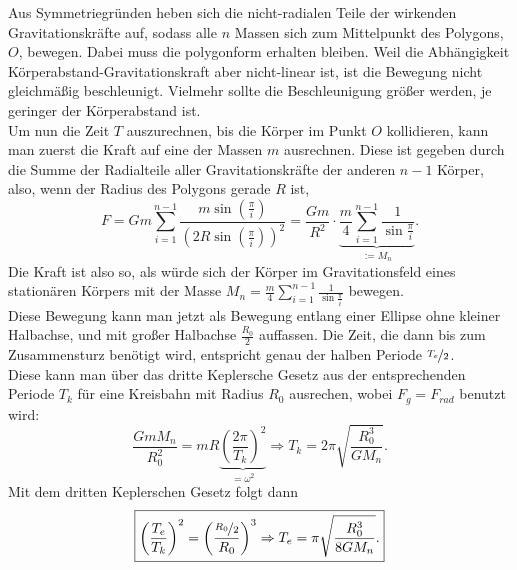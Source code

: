 \begin{Answer}[ref = polygrav]
	Aus Symmetriegründen heben sich die nicht-radialen Teile der wirkenden Gravitationskräfte auf, sodass alle $n$ Massen sich zum Mittelpunkt des Polygons, $O$, bewegen. Dabei muss die polygonform erhalten bleiben. Weil die Abhängigkeit Körperabstand-Gravitationskraft aber nicht-linear ist, ist die Bewegung nicht gleichmäßig beschleunigt. Vielmehr sollte die Beschleunigung größer werden, je geringer der Körperabstand ist.\\
	Um nun die Zeit $T$ auszurechnen, bis die Körper im Punkt $O$ kollidieren, kann man zuerst die Kraft auf eine der Massen $m$ ausrechnen. Diese ist gegeben durch die Summe der Radialteile aller  Gravitationskräfte der anderen $n-1$ Körper, also, wenn der Radius des Polygons gerade $R$ ist,
	\begin{equation}\label{polygrav:f}
		F = Gm \sum_{i= 1}^{n-1}\frac{m \sin\left(\frac{\pi}{i}\right)}{\left(2R  \sin\left(\frac{\pi}{i}\right)\right)^2} = \frac{Gm}{R^2}\cdot \underbrace{ \frac{m}{4}\sum_{i=1}^{n-1} \frac{1}{\sin \frac{\pi}{i}}}_{:= M_n}.
 	\end{equation}
 	Die Kraft ist also so, als würde sich der Körper im Gravitationsfeld eines stationären Körpers mit der Masse $M_n = \frac{m}{4}\sum_{i=1}^{n-1} \frac{1}{\sin \frac{\pi}{i}}$ bewegen.\\
 	Diese Bewegung kann man jetzt als Bewegung entlang einer Ellipse ohne kleiner Halbachse, und mit großer Halbachse $\frac{R_0}{2}$ auffassen. Die Zeit, die dann bis zum Zusammensturz benötigt wird, entspricht genau der halben Periode $\nicefrac{T_e}{2}$. \\
 	Diese kann man über das dritte Keplersche Gesetz aus der entsprechenden Periode $T_k$ für eine Kreisbahn mit Radius $R_0$ ausrechen, wobei $F_g = F_{rad}$ benutzt wird:
 	\begin{equation}\label{polygrav:tc}
 		\frac{GmM_n}{R_0^2}  = m R\underbrace{\left(\frac{2\pi}{T_k}\right)^2}_{=\omega ^2} \Rightarrow T_k = 2\pi\sqrt{\frac{R_0^3}{GM_n}}.
 	\end{equation}
 	Mit dem dritten Keplerschen Gesetz folgt dann
 	\begin{equation}
 	\boxed{	\left(\frac{T_e}{T_k}\right)^2 = \left(\frac{\nicefrac{R_0}{2}}{R_0}\right)^3 \Rightarrow T_e = \pi \sqrt{\frac{R_0^3}{8GM_n}}.}
 	\end{equation}
\end{Answer}
